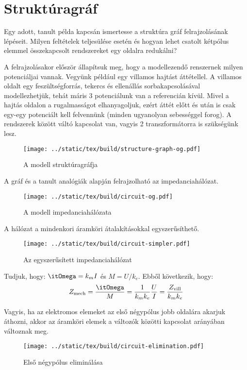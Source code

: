 \documentclass[../main.tex]{subfiles}
\begin{document}
\section{Struktúragráf}

\begin{fulltheorem}
  Egy adott, tanult példa kapcsán ismertesse a struktúra gráf felrajzolásának
  lépéseit. Milyen feltételek teljesülése esetén és hogyan lehet csatolt
  kétpólus elemmel összekapcsolt rendszereket egy oldalra redukálni?
\end{fulltheorem}

A  felrajzolásakor először állapítsuk meg, hogy a modellezendő
renszernek milyen potenciáljai vannak. Vegyünk például egy villamos hajtást
áttétellel. A villamos oldalt egy feszültségforrás, tekercs és ellenállás
sorbakapcsolásával modellezhetjük, tehát máris 3 potenciálunk van a referencián
kívül. Mivel a hajtás oldalon a rugalmasságot elhanyagoljuk, ezért áttét előtt
és után is csak egy-egy potenciált kell felvennünk (minden ugyanolyan sebességgel
forog). A rendszerek között váltó kapcsolat van, vagyis 2 transzformátorra is
szükségünk lesz.
\begin{figure}[H]
  \centering
  \texttt{[image: ../static/tex/build/structure-graph-og.pdf]}
  \caption{A modell struktúragráfja}
  \label{fig:structure-graph-og}
\end{figure}

A gráf és a tanult analógiák alapján felrajzolható az impedanciahálózat.
\begin{figure}[H]
  \centering
  \texttt{[image: ../static/tex/build/circuit-og.pdf]}
  \caption{A modell impedanciahálózata}
  \label{fig:circuit-og}
\end{figure}

A hálózat a mindenkori áramköri átalakításokkal egyszerűsíthető.
\begin{figure}[H]
  \centering
  \texttt{[image: ../static/tex/build/circuit-simpler.pdf]}
  \caption{Az egyszerűsített impedanciahálózat}
  \label{fig:circuit-simpler}
\end{figure}

Tudjuk, hogy: $\itOmega = k_m I$ és $M = U / k_e$. Ebből következik, hogy:
\[
  Z_\text{mech}
  = \frac{\itOmega}{M}
  = \frac{1}{k_m k_e} \frac{U}{I}
  = \frac{Z_\text{vill}}{k_m k_e}
\]

Vagyis, ha az elektromos elemeket az első négypólus jobb oldalára akarjuk
áthozni, akkor az áramköri elemek a változók közötti kapcsolat arányában
változnak meg.
\begin{figure}[H]
  \centering
  \texttt{[image: ../static/tex/build/circuit-elimination.pdf]}
  \caption{Első négypólus eliminálása}
  \label{fig:circuit-elimination}
\end{figure}
\end{document}

